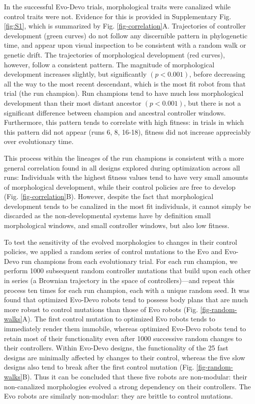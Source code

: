 In the successful Evo-Devo trials, morphological traits were canalized while control traits were not.
Evidence for this is provided in Supplementary Fig. \ref{fig:S1},%
which is summarized by Fig. \ref{fig-correlation}A.
Trajectories of controller development (green curves) do not follow any discernible pattern in phylogenetic time, and appear upon visual inspection to be consistent with a random walk or genetic drift.
The trajectories of morphological development (red curves), however, follow a consistent pattern.
The magnitude of morphological development increases slightly, but significantly $(p<0.001)$, before decreasing all the way to the most recent descendant, which is the most fit robot from that trial (the run champion). 
Run champions tend to have much less morphological development than their most distant ancestor $(p<0.001)$, but there is not a significant difference between champion and ancestral controller windows.
Furthermore, this pattern tends to correlate with high fitness: in trials in which this pattern did not appear (runs 6, 8, 16-18), fitness did not increase appreciably over evolutionary time.

This process within the lineages of the run champions is consistent with a more general correlation found in all designs explored during optimization across all runs: Individuals with the highest fitness values tend to have very small amounts of morphological development, while their control policies are free to develop (Fig. \ref{fig-correlation}B).
However, despite the fact that morphological development tends to be canalized in the most fit individuals, it cannot simply be discarded as the non-developmental systems have by definition small morphological windows, and small controller windows, but also low fitness.  


To test the sensitivity of the evolved morphologies to changes in their control policies, we applied a random series of control mutations to the Evo and Evo-Devo run champions from each evolutionary trial.
For each run champion, we perform 1000 subsequent random controller mutations that build upon each other in series (a Brownian trajectory in the space of controllers)---and repeat this process ten times for each run champion, each with a unique random seed.
It was found that optimized Evo-Devo robots tend to possess body plans that are much more robust to control mutations than those of Evo robots (Fig. \ref{fig-random-walks}A).
The first control mutation to optimized Evo robots tends to immediately render them immobile, whereas optimized Evo-Devo robots tend to retain most of their functionality even after 1000 successive random changes to their controllers.
Within Evo-Devo designs, the functionality of the 25 fast designs are minimally affected by changes to their control, whereas the five slow designs also tend to break after the first control mutation (Fig. \ref{fig-random-walks}B). 
Thus it can be concluded that these five robots are non-modular: their non-canalized morphologies evolved a strong dependency on their controllers. 
The Evo robots are similarly non-modular: they are brittle to control mutations. 


